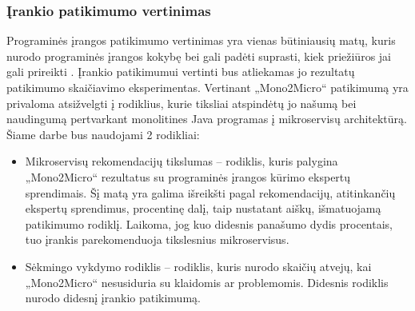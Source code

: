 \documentclass{VUMIFPSbakalaurinis}
\begin{document}
\subsubsection{Įrankio patikimumo vertinimas}
Programinės įrangos patikimumo vertinimas yra vienas būtiniausių matų, kuris nurodo programinės įrangos kokybę bei gali padėti suprasti, kiek priežiūros jai gali prireikti \cite{MarCY}. Įrankio patikimumui vertinti bus atliekamas jo rezultatų patikimumo skaičiavimo eksperimentas. Vertinant „Mono2Micro“ patikimumą yra privaloma atsižvelgti į rodiklius, kurie tiksliai atspindėtų jo našumą bei naudingumą pertvarkant monolitines Java programas į mikroservisų architektūrą. Šiame darbe bus naudojami 2 rodikliai:
\begin{itemize}
    \item Mikroservisų rekomendacijų tikslumas -- rodiklis, kuris palygina „Mono2Micro“ rezultatus su programinės įrangos kūrimo ekspertų sprendimais. Šį matą yra galima išreikšti pagal rekomendacijų, atitinkančių ekspertų sprendimus, procentinę dalį, taip nustatant aiškų, išmatuojamą patikimumo rodiklį. Laikoma, jog kuo didesnis panašumo dydis procentais, tuo įrankis parekomenduoja tikslesnius mikroservisus.

    \item Sėkmingo vykdymo rodiklis -- rodiklis, kuris nurodo skaičių atvejų, kai „Mono2Micro“ nesusiduria su klaidomis ar problemomis. Didesnis rodiklis nurodo didesnį įrankio patikimumą.
    \newline 
    



\end{itemize}
\end{document}
